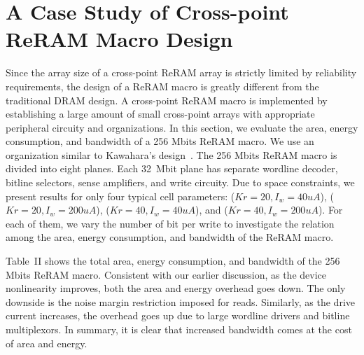 \vspace{-5pt}
\section{A Case Study of Cross-point ReRAM Macro Design}\label{sec:macro}
Since the array size of a cross-point ReRAM array is strictly limited by
reliability requirements, the design of a ReRAM macro is greatly different
from the traditional DRAM design. A cross-point ReRAM macro is implemented
by establishing a large amount of small cross-point arrays with
appropriate peripheral circuity and organizations. In this section, we
evaluate the area, energy consumption, and bandwidth of a 256 Mbits ReRAM
macro.
We use an organization similar to Kawahara's design~\cite{crossbar_Panasonic}.
The 256 Mbits ReRAM macro is divided into 
eight planes. Each 32~Mbit plane has separate wordline
decoder, bitline selectors, sense amplifiers, and write circuity. Due to
space constraints, we present results for only
four typical cell parameters: ($Kr=20,
I_w=40uA$), ($Kr=20, I_w=200uA$), ($Kr=40, I_w=40uA$), and ($Kr=40,
I_w=200uA$). For each of them, we vary the number of bit per write to
investigate the relation among the area, energy consumption, and bandwidth
of the ReRAM macro.


Table~II shows the total area, energy consumption, and bandwidth of the
256 Mbits ReRAM macro. Consistent with our earlier discussion, 
as the device nonlinearity improves, both the area and energy 
overhead goes down. The only downside is the noise margin restriction
imposed for reads. Similarly, as the drive current increases, the overhead
goes up due to large wordline drivers and bitline multiplexors. 
In summary, it is clear that increased bandwidth comes at the cost of area
and energy. 

